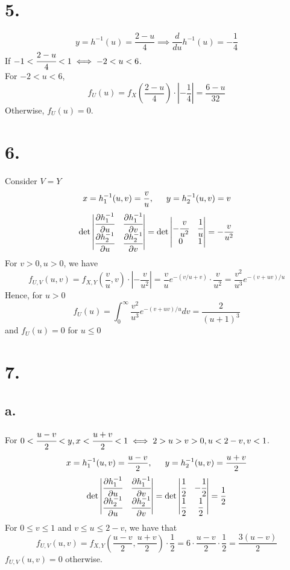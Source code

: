\documentclass[11pt]{article}
\begin{document}
\section*{5.}
\[
    y = h^{-1}(u) = \frac{2-u}{4} \implies \frac{d}{du}h^{-1}(u) = -\frac{1}{4}    
\]
If $-1<\cfrac{2-u}{4}< 1 \iff -2<u<6$. \\
For $-2<u<6$, 
\[
    f_U(u) = f_X\left(\frac{2-u}{4}\right) \cdot \left|-\frac{1}{4}\right| = \frac{6-u}{32} 
\]
Otherwise, $f_U(u) = 0$.
\pagebreak
\section*{6.}
Consider $V=Y$
\[
    x = h_1^{-1}(u,v) = \frac{v}{u}, \indent  y = h_2^{-1}(u,v) = v
\]
\[
    \det 
    \begin{vmatrix}
        \cfrac{\partial h_1^{-1}}{\partial u} & \cfrac{\partial h_1^{-1}}{\partial v} \\
        \cfrac{\partial h_2^{-1}}{\partial u} & \cfrac{\partial h_2^{-1}}{\partial v}
    \end{vmatrix}    
    = 
    \det 
    \begin{vmatrix}
        -\cfrac{v}{u^2} & \cfrac{1}{u} \\
        0 & 1 
    \end{vmatrix}
    = -\frac{v}{u^2}
\]
For $v>0, u>0$, we have 
\[
    f_{U,V}(u,v) = f_{X,Y}\left(\frac{v}{u}, v\right) \cdot \left| -\frac{v}{u^2} \right| =  
    \frac{v}{u} e^{-(v/u + v)} \cdot \frac{v}{u^2} = \frac{v^2}{u^3}e^{-(v+uv)/u} 
\]
Hence, for $u>0$
\[
    f_U(u) = \int_0^\infty \frac{v^2}{u^3}e^{-(v+uv)/u} dv = \dfrac{2}{\left(u+1\right)^3}
\]
and $f_U(u) = 0$ for $u \le 0$
\pagebreak
\section*{7.}
\subsection*{a.}
For $0<\cfrac{u-v}{2}<y, x<\cfrac{u+v}{2}<1 \iff 2>u>v>0, u<2-v, v<1$.
\[
    x = h_1^{-1}(u,v) = \frac{u-v}{2}, \indent y = h_2^{-1}(u,v) = \frac{u+v}{2}    
\]
\[
    \det 
    \begin{vmatrix}
        \cfrac{\partial h_1^{-1}}{\partial u} & \cfrac{\partial h_1^{-1}}{\partial v} \\
        \cfrac{\partial h_2^{-1}}{\partial u} & \cfrac{\partial h_2^{-1}}{\partial v}
    \end{vmatrix}    
    = 
    \det 
    \begin{vmatrix}
        \cfrac{1}{2} & -\cfrac{1}{2} \\
        \cfrac{1}{2} & \cfrac{1}{2} 
    \end{vmatrix}
    = \frac{1}{2}
\]
For $0\le v \le 1$ and $v\le u\le 2-v$, we have that 
\[
    f_{U,V}(u,v) = f_{X,Y}\left( \frac{u-v}{2}, \frac{u+v}{2}\right) \cdot \frac{1}{2} 
    = 6 \cdot \frac{u-v}{2} \cdot \frac{1}{2} = \frac{3(u-v)}{2}     
\]
$f_{U,V}(u,v) = 0$ otherwise.
\end{document}
